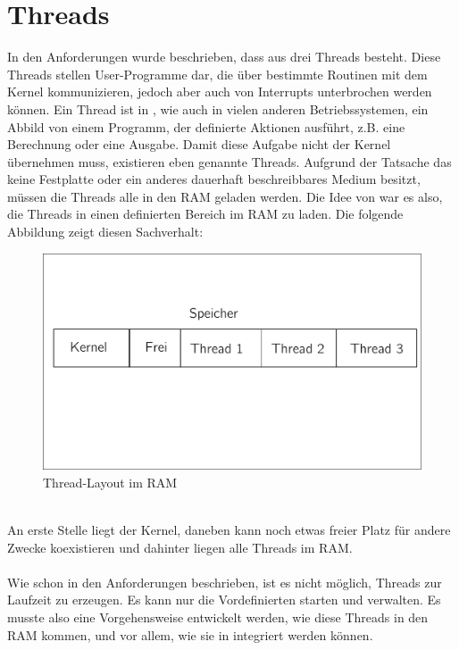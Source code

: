 \section{Threads}
In den Anforderungen wurde beschrieben, dass \mops aus drei Threads besteht. Diese Threads stellen User-Programme dar, die \"uber bestimmte Routinen mit dem Kernel kommunizieren, jedoch aber auch von Interrupts unterbrochen werden k\"onnen. Ein Thread ist in \mops, wie auch in vielen anderen Betriebssystemen, ein Abbild von einem Programm, der definierte Aktionen ausf\"uhrt, z.B. eine Berechnung oder eine Ausgabe. Damit diese Aufgabe nicht der Kernel \"ubernehmen muss, existieren eben genannte Threads. Aufgrund der Tatsache das \mops keine Festplatte oder ein anderes dauerhaft beschreibbares Medium besitzt, m\"ussen die Threads alle in den RAM geladen werden. Die Idee von \mops war es also, die Threads in einen definierten Bereich im RAM zu laden. Die folgende Abbildung zeigt diesen Sachverhalt:
\begin{figure}[h!]
	\centering
	\includegraphics[scale=0.60]{common/draft-thread-overview.pdf}	
	\caption{Thread-Layout im RAM}
	\label{draft:draft-thread-overview}
\end{figure}\\
An erste Stelle liegt der Kernel, daneben kann noch etwas freier Platz f\"ur andere Zwecke koexistieren und dahinter liegen alle Threads im RAM.
\\\\
Wie schon in den Anforderungen beschrieben, ist es \mops nicht m\"oglich, Threads zur Laufzeit zu erzeugen. Es kann nur die Vordefinierten starten und verwalten. Es musste also eine Vorgehensweise entwickelt werden, wie diese Threads in den RAM kommen, und vor allem, wie sie in \mops integriert werden k\"onnen. \\
